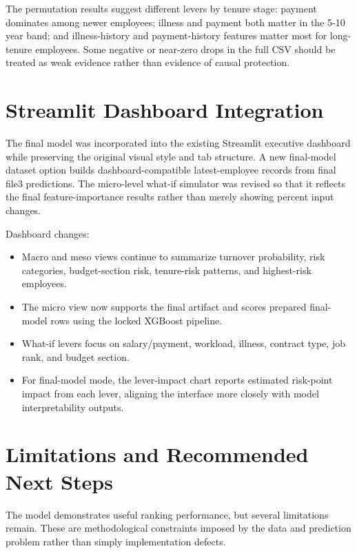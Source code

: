 \documentclass[11pt]{article}
\begin{document}
The permutation results suggest different levers by tenure stage: payment dominates among newer employees; illness and payment both matter in the 5-10 year band; and illness-history and payment-history features matter most for long-tenure employees. Some negative or near-zero drops in the full CSV should be treated as weak evidence rather than evidence of causal protection.

\section{Streamlit Dashboard Integration}

The final model was incorporated into the existing Streamlit executive dashboard while preserving the original visual style and tab structure. A new final-model dataset option builds dashboard-compatible latest-employee records from final file3 predictions. The micro-level what-if simulator was revised so that it reflects the final feature-importance results rather than merely showing percent input changes.

Dashboard changes:
\begin{itemize}
    \item Macro and meso views continue to summarize turnover probability, risk categories, budget-section risk, tenure-risk patterns, and highest-risk employees.
    \item The micro view now supports the final artifact and scores prepared final-model rows using the locked XGBoost pipeline.
    \item What-if levers focus on salary/payment, workload, illness, contract type, job rank, and budget section.
    \item For final-model mode, the lever-impact chart reports estimated risk-point impact from each lever, aligning the interface more closely with model interpretability outputs.
\end{itemize}

\section{Limitations and Recommended Next Steps}

The model demonstrates useful ranking performance, but several limitations remain. These are methodological constraints imposed by the data and prediction problem rather than simply implementation defects.
\end{document}
